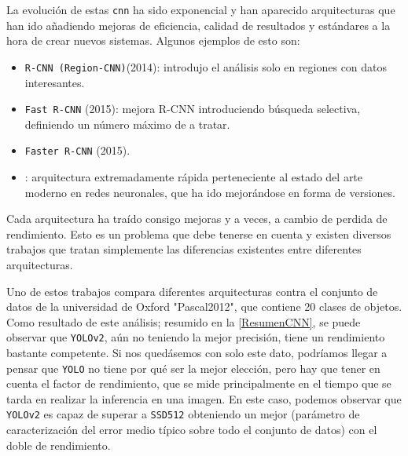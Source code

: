 \clearpage

La evolución de estas \texttt{\acrshort{cnn}} ha sido exponencial y han aparecido arquitecturas que han ido añadiendo mejoras de eficiencia, calidad de resultados y estándares a la hora de crear nuevos 
sistemas. Algunos ejemplos de esto son:
\begin{itemize}
    \item \texttt{R-CNN (Region-CNN)}(2014): introdujo el análisis solo en regiones con datos interesantes.
    \item \texttt{Fast R-CNN} (2015): mejora R-CNN introduciendo búsqueda selectiva, definiendo un número máximo de \texttt{} a tratar.
    \item \texttt{Faster R-CNN} (2015).
    \item \texttt{}\cite{redmonYouOnlyLook2016}: arquitectura extremadamente rápida perteneciente al estado del arte moderno en redes neuronales, que ha ido mejorándose en forma de versiones.
\end{itemize}

Cada arquitectura ha traído consigo mejoras y a veces, a cambio de perdida de rendimiento. Esto es un problema que debe tenerse en cuenta y existen diversos trabajos que tratan simplemente las diferencias 
existentes entre diferentes arquitecturas.

Uno de estos trabajos\cite{hanAdvancedDeepLearningTechniques2018} compara diferentes arquitecturas contra el conjunto de datos de la universidad de Oxford "Pascal2012"\cite{PASCALVisualObject}, que contiene 20 clases de objetos.\newline
Como resultado de este análisis; resumido en la \autoref{ResumenCNN}, se puede observar que \texttt{YOLOv2}, aún no teniendo la mejor precisión, tiene un rendimiento bastante competente. Si nos quedásemos con solo este dato, podríamos llegar a pensar que \texttt{YOLO} 
no tiene por qué ser la mejor elección, pero hay que tener en cuenta el factor de rendimiento, que se mide principalmente en el tiempo que se tarda en realizar la inferencia en una imagen. En este caso, podemos observar 
que \texttt{YOLOv2} es capaz de superar a \texttt{SSD512} obteniendo un mejor \texttt{}(parámetro de caracterización del error medio típico sobre todo el conjunto de datos) con el doble de rendimiento.

